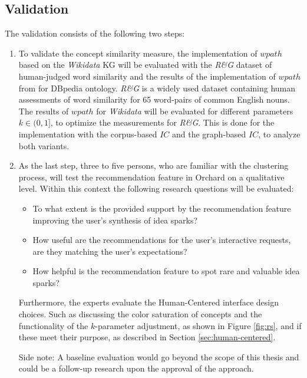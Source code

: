 \documentclass[pdftex,a4paper,12pt]{scrartcl}
\theoremstyle{definition}
\begin{document}
    \subsection{Validation}
    The validation consists of the following two steps:  
    \begin{enumerate}[ref =\thesubsection.\theenumi]
        \item To validate the concept similarity measure, the implementation of $wpath$ based on the \textit{Wikidata} KG will be evaluated with the \textit{R\&G} dataset \citep{rubenstein_contextual_1965} of human-judged word similarity and the results of the implementation of $wpath$ from \citet{zhu_computing_2017} for DBpedia ontology. \textit{R\&G} is a widely used dataset containing human assessments of word similarity for 65 word-pairs of common English nouns.
        The results of $wpath$ for \textit{Wikidata} will be evaluated for different parameters $k \in (0,1]$, to optimize the measurements for \textit{R\&G}. This is done for the implementation with the corpus-based $IC$ and the graph-based $IC$, to analyze both variants. 
        \item \label{sec:user-study} As the last step, three to five persons, who are familiar with the clustering process, will test the recommendation feature in Orchard on a qualitative level. Within this context the following research questions will be evaluated:
        \begin{itemize}
            \item To what extent is the provided support by the recommendation feature improving the user's synthesis of idea sparks?
            \item How useful are the recommendations for the user's interactive requests, are they matching the user's expectations?
            \item How helpful is the recommendation feature to spot rare and valuable idea sparks?
        \end{itemize}
        
        Furthermore, the experts evaluate the Human-Centered interface design choices. Such as discussing the color saturation of concepts and the functionality of the $k$-parameter adjustment, as shown in Figure \ref{fig:rs}, and if these meet their purpose, as described in Section \ref{sec:human-centered}.
        
        Side note: A baseline evaluation would go beyond the scope of this thesis and could be a follow-up research upon the approval of the approach. 
    \end{enumerate} 
    
\end{document}
